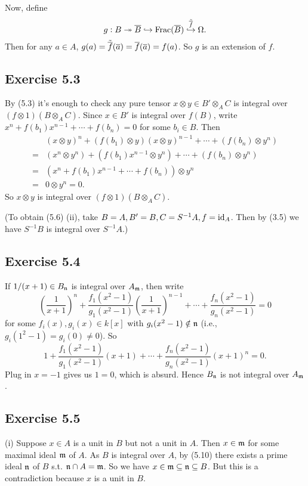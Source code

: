 \documentclass[../A&M.tex]{subfiles}
\begin{document}
Now, define
$$
g: B \twoheadrightarrow \overline{B} \hookrightarrow \operatorname{Frac}(\overline{B}) \overset{\tilde{\overline{f}}}{\hookrightarrow} \Omega.
$$
Then for any $a\in A$, $g(a) = \tilde{\overline{f}}(\overline{a}) = \overline{f}(\overline{a}) = f(a)$. So $g$ is an extension of $f$.

\subsection*{Exercise 5.3}

By (5.3) it's enough to check any pure tensor $x \otimes y \in B' \otimes_A C$ is integral over $(f \otimes 1)(B \otimes_A C)$. Since $x \in B'$ is integral over $f(B)$, write $x^n + f(b_1)x^{n-1} + \cdots + f(b_n) = 0$ for some $b_i \in B$. Then
\begin{align*}
&(x \otimes y)^n + (f(b_1) \otimes y)(x \otimes y)^{n-1} + \cdots + (f(b_n) \otimes y^n)    \\
={} &(x^n \otimes y^n) + (f(b_1)x^{n-1} \otimes y^n) + \cdots + (f(b_n) \otimes y^n)  \\
={} &(x^n + f(b_1)x^{n-1} + \cdots + f(b_n)) \otimes y^n   \\
={} &0 \otimes y^n = 0.
\end{align*}
So $x \otimes y$ is integral over $(f \otimes 1)(B \otimes_A C)$.

(To obtain (5.6) (ii), take $B=A, B'=B, C=S^{-1}A, f=\operatorname{id}_A$. Then by (3.5) we have $S^{-1}B$ is integral over $S^{-1}A$.)

\subsection*{Exercise 5.4}

If $1/(x+1) \in B_{\mathfrak{n}}$ is integral over $A_{\mathfrak{m}}$, then write
$$
\left( \frac{1}{x+1} \right)^n + \frac{f_1(x^2-1)}{g_1(x^2-1)} \left( \frac{1}{x+1} \right)^{n-1} + \cdots + \frac{f_n(x^2-1)}{g_n(x^2-1)} = 0
$$
for some $f_i(x),g_i(x) \in k[x]$ with $g_i(x^2-1) \notin \mathfrak{n}$ (i.e., $g_i(1^2-1) = g_i(0) \neq 0$). So
$$
1 + \frac{f_1(x^2-1)}{g_1(x^2-1)} (x+1) + \cdots + \frac{f_n(x^2-1)}{g_n(x^2-1)} (x+1)^n = 0.
$$
Plug in $x=-1$ gives us $1=0$, which is absurd. Hence $B_{\mathfrak{n}}$ is not integral over $A_{\mathfrak{m}}$.

\subsection*{Exercise 5.5}

(i) Suppose $x\in A$ is a unit in $B$ but not a unit in $A$. Then $x\in\mathfrak{m}$ for some maximal ideal $\mathfrak{m}$ of $A$. As $B$ is integral over $A$, by (5.10) there exists a prime ideal $\mathfrak{n}$ of $B$ s.t. $\mathfrak{n} \cap A = \mathfrak{m}$. So we have $x\in \mathfrak{m} \subseteq \mathfrak{n} \subseteq B$. But this is a contradiction because $x$ is a unit in $B$.
\end{document}
